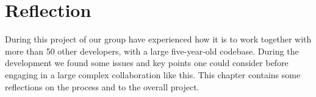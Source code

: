 \chapter{Reflection}
\label{cha:reflection}

During this project of \giraf our group have experienced how it is to work together with more than 50 other developers, with a large five-year-old codebase. During the development we found some issues and key points one could consider before engaging in a large complex collaboration like this. This chapter contains some reflections on the process and to the overall project.

